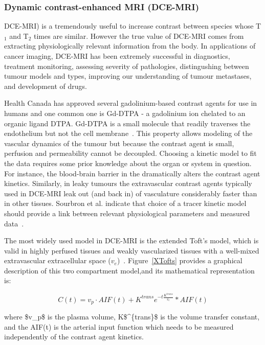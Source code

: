 \subsubsection{Dynamic contrast-enhanced MRI (\acs{DCE-MRI})}

\acs{DCE-MRI}) is a tremendously useful to increase contrast between species whose T$_1$ and T$_2$ times are similar.
However the true value of \acs{DCE-MRI} comes from extracting physiologically relevant information from the body. 
In applications of cancer imaging, \acs{DCE-MRI} has been extremely successful in diagnostics, treatment monitoring, assessing severity of pathologies, distingushing between tumour models and types, improving our understanding of tumour metastases, and development of drugs.

Health Canada has approved several gadolinium-based contrast agents for use in humans and one common one is \acs{Gd-DTPA} - a gadolinium ion chelated to an organic ligand DTPA.
\acs{Gd-DTPA} is a small molecule that readily traverses the endothelium but not the cell membrane~\cite{WalkerSamuel:2006ch}. 
This property allows modeling of the vascular dynamics of the tumour but because the contrast agent is small, perfusion and permeability cannot be decoupled.
Choosing a kinetic model to fit the data requires some prior knowledge about the organ or system in question. 
For instance, the blood-brain barrier in the dramatically alters the contrast agent kinetics. 
Similarly, in leaky tumours the extravascular contrast agents typically used in \acs{DCE-MRI} leak out (and back in) of vasculature considerably faster than in other tissues. 
Sourbron et al. indicate that choice of a tracer kinetic model should provide a link between relevant physiological parameters and measured data~\cite{Sourbron:2011ce}. 

The most widely used model in \acs{DCE-MRI} is the extended Toft's model, which is valid in highly perfused tissues and weakly vascularized tissues with a well-mixed extravascular extracellular space ($v_e$)~\cite{Sourbron:2013jz}.
Figure~\ref{XTofts} provides a graphical description of this two compartment model,and its mathematical representation is:

\begin{equation}
C(t) = v_p \cdot AIF(t) + K^{trans}e^{-t\frac{K^{trans}}{v_e}} * AIF(t)
\end{equation}

where \acs{$v_p$} is the plasma volume, \acs{K$^{trans}$} is the volume transfer constant, and the \acs{AIF}(t) is the arterial input function which needs to be measured independently of the contrast agent kinetics.


